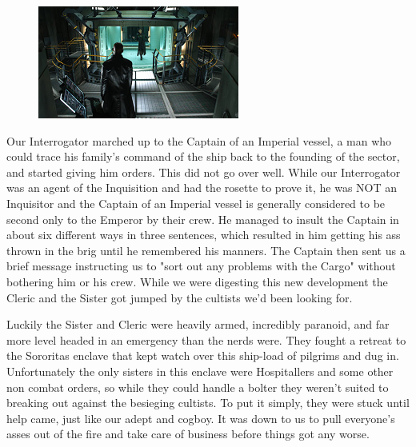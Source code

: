 \begin{figure}
	\begin{center}
		\includegraphics[width=\figwidth]{pics/2/9.png}
	\end{center}
\end{figure}
Our Interrogator marched up to the Captain of an Imperial vessel, a man who could trace his family's command of the ship back to the founding of the sector, and started giving him orders. 
This did not go over well. 
While our Interrogator was an agent of the Inquisition and had the rosette to prove it, he was NOT an Inquisitor and the Captain of an Imperial vessel is generally considered to be second only to the Emperor by their crew. 
He managed to insult the Captain in about six different ways in three sentences, which resulted in him getting his ass thrown in the brig until he remembered his manners.
The Captain then sent us a brief message instructing us to "sort out any problems with the Cargo" without bothering him or his crew. 
While we were digesting this new development the Cleric and the Sister got jumped by the cultists we'd been looking for.

Luckily the Sister and Cleric were heavily armed, incredibly paranoid, and far more level headed in an emergency than the nerds were. 
They fought a retreat to the Sororitas enclave that kept watch over this ship-load of pilgrims and dug in. 
Unfortunately the only sisters in this enclave were Hospitallers and some other non combat orders, so while they could handle a bolter they weren't suited to breaking out against the besieging cultists. 
To put it simply, they were stuck until help came, just like our adept and cogboy. 
It was down to us to pull everyone's asses out of the fire and take care of business before things got any worse.

